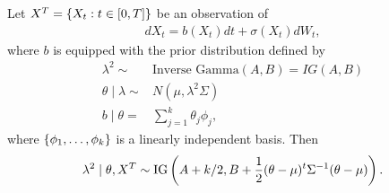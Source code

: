 \documentclass[12pt]{article}
\begin{document}
\begin{lemma}
	Let \(X^T=\left\{ X_t:t\in[0,T] \right\}\) be an observation of 
	\begin{align*}
	dX_t=b(X_t)dt+\sigma(X_t)dW_t,
	\end{align*}
	where \(b\) is equipped with the prior distribution defined by 
	\begin{align*}
	\lambda^2 \sim & \text{Inverse Gamma}(A,B)=IG(A,B)\\
	\theta \mid \lambda \sim & N(\mu,\lambda^2\Sigma)\\
	b\mid \theta = & \sum_{j=1}^k\theta_j\phi_j,
	\end{align*}
	where \(\left\{ \phi_1,\ldots,\phi_k \right\}\) is a linearly independent basis. Then 
	\[
	\lambda^2 \mid \theta, X^T \sim \text{IG}\left(  A + k/2 , B+ \frac12 (\theta-\mu)^t\Sigma^{-1}(\theta-\mu)  \right).
	\] 
\end{lemma}
\end{document}
